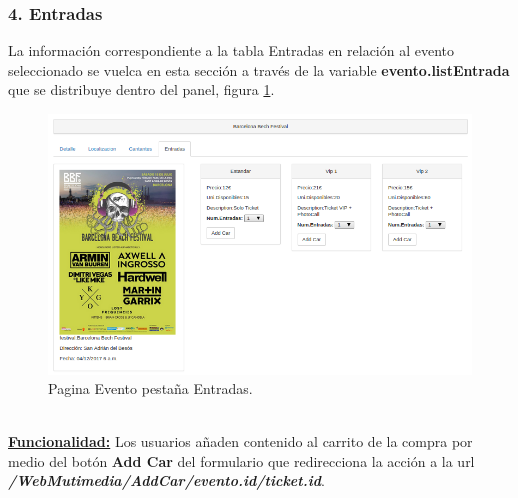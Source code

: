 \subsubsection*{4. Entradas}
La información correspondiente a la tabla Entradas en relación al evento seleccionado se vuelca en esta sección a través de la variable \textbf{evento.listEntrada} que se distribuye dentro del panel, figura \ref{fig:Entradas_Evento}.
\begin{figure}[!h]
\begin{center}
   \includegraphics[width=0.5\linewidth]{Figures/Entradas_Evento}
	\decoRule
	\caption[Evento pestaña Entradas]{Pagina Evento pestaña Entradas.}
\label{fig:Entradas_Evento}
\end{center}
\end{figure}
\\\underline{\textbf{Funcionalidad:}} Los usuarios añaden contenido al carrito de la compra por medio del botón \textbf{Add Car} del formulario que redirecciona la acción a la url \textbf{\textit{/WebMutimedia/AddCar/{{evento.id}}/{{ticket.id}}}}.
